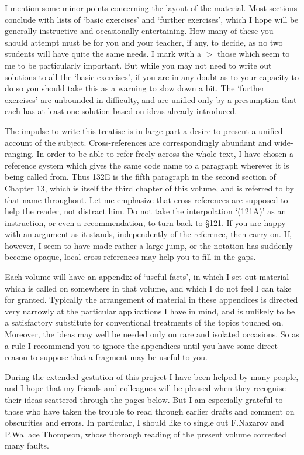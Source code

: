 I mention some minor points concerning the layout of the material.
Most sections conclude with lists of `basic exercises' and
`further exercises', which I hope will be generally instructive and
occasionally entertaining.   How many of these you should attempt must
be for you and your teacher, if any, to decide, as no two students will
have quite the same needs.   I mark with a $\pmb{>}$ those which seem to
me to be particularly important.   But while you may not need to write
out solutions to all the `basic exercises', if you are in any doubt
as to your capacity to do so you should take this as a warning to slow
down a bit.   The `further exercises' are unbounded in difficulty,
and are unified only by a presumption that each has at least one
solution based on ideas already introduced.

The impulse to write this treatise is in large part a desire to present
a unified account of the subject.   Cross-references are correspondingly
abundant and wide-ranging.   In order to be able to refer freely across
the whole
text, I have chosen a reference system which gives the same code name to
a paragraph wherever it is being called from.   Thus 132E is the fifth
paragraph in the second section of Chapter 13, which is itself the
third chapter of this volume, and is referred to by that name
throughout.
Let me emphasize that cross-references are supposed to help the reader,
not distract him.   Do not take the interpolation `(121A)' as an
instruction, or even a recommendation, to turn back to \S121.
If you are happy with an argument as it stands,
independently of the reference, then carry on.   If, however, I seem to
have made rather a large jump, or the notation has suddenly become
opaque, local cross-references may help you to fill in the gaps.

Each volume will have an appendix of `useful facts', in which I set
out material which is called on somewhere in that volume, and which I do
not feel I can take for granted.   Typically the arrangement of material
in these appendices is directed very narrowly at the particular
applications I have in mind, and is unlikely to be a satisfactory
substitute for conventional treatments of the topics touched on.
Moreover, the ideas may well be needed only on rare and isolated
occasions.   So as a rule I
recommend you to ignore the appendices until you have some
direct reason to suppose that a fragment may be useful to you.

During the extended gestation of this project I have been helped by many
people, and I hope that my friends and colleagues will be pleased when
they recognise their ideas scattered through the pages below.   But I am
especially grateful to those who have taken the trouble to read through
earlier drafts and comment on obscurities and errors.   In particular, I
should like to single out F.Nazarov and P.Wallace Thompson, whose thorough 
reading of the present volume corrected many faults.

